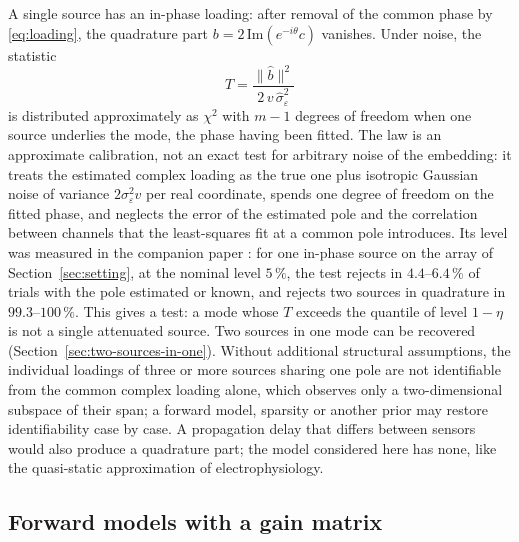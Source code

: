 \documentclass{article}
\begin{document}
A single source has an in-phase loading: after removal of the common phase by \eqref{eq:loading}, the quadrature part $b = 2\, \mathrm{Im}(e^{-i\theta} c)$ vanishes. Under noise, the statistic \[
T = \frac{\lVert \widehat{b} \rVert^{2}}{2\, v\, \widehat{\sigma}_\varepsilon^{2}}
\] is distributed approximately as $\chi^2$ with $m - 1$ degrees of freedom when one source underlies the mode, the phase having been fitted. The law is an approximate calibration, not an exact test for arbitrary noise of the embedding: it treats the estimated complex loading as the true one plus isotropic Gaussian noise of variance $2\sigma_\varepsilon^{2} v$ per real coordinate, spends one degree of freedom on the fitted phase, and neglects the error of the estimated pole and the correlation between channels that the least-squares fit at a common pole introduces. Its level was measured in the companion paper \cite{ref-companionA}: for one in-phase source on the array of Section~\ref{sec:setting}, at the nominal level $5\,\%$, the test rejects in $4.4$--$6.4\,\%$ of trials with the pole estimated or known, and rejects two sources in quadrature in $99.3$--$100\,\%$. This gives a test: a mode whose $T$ exceeds the quantile of level $1 - \eta$ is not a single attenuated source. Two sources in one mode can be recovered (Section~\ref{sec:two-sources-in-one}). Without additional structural assumptions, the individual loadings of three or more sources sharing one pole are not identifiable from the common complex loading alone, which observes only a two-dimensional subspace of their span; a forward model, sparsity or another prior may restore identifiability case by case. A propagation delay that differs between sensors would also produce a quadrature part; the model considered here has none, like the quasi-static approximation of electrophysiology.

\subsection{Forward models with a gain matrix}\label{sec:forward-models-with-a}
\end{document}
